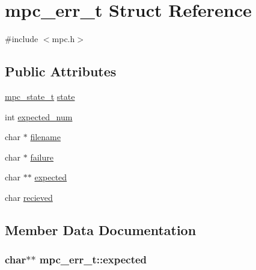 \hypertarget{structmpc__err__t}{}\section{mpc\+\_\+err\+\_\+t Struct Reference}
\label{structmpc__err__t}


{\ttfamily \#include $<$mpc.\+h$>$}

\subsection*{Public Attributes}
\begin{DoxyCompactItemize}
\item 
\hyperlink{structmpc__state__t}{mpc\+\_\+state\+\_\+t} \hyperlink{structmpc__err__t_ae853dbb8233311c81426d93839e5fae7}{state}
\item 
int \hyperlink{structmpc__err__t_ae577756565dd7a3cbc734ef8257d529c}{expected\+\_\+num}
\item 
char $\ast$ \hyperlink{structmpc__err__t_ae775901278f5c56fc3c5f95ae0ba2bc0}{filename}
\item 
char $\ast$ \hyperlink{structmpc__err__t_ae49eac3061b0608446f80b168cebbbc0}{failure}
\item 
char $\ast$$\ast$ \hyperlink{structmpc__err__t_acb5d0005a58f2ed13d22d3a45d69f0ae}{expected}
\item 
char \hyperlink{structmpc__err__t_a63ece2ebc4e4df2ebd89bebfddde7984}{recieved}
\end{DoxyCompactItemize}


\subsection{Member Data Documentation}
\hypertarget{structmpc__err__t_acb5d0005a58f2ed13d22d3a45d69f0ae}{}
\subsubsection[{expected}]{\setlength{\rightskip}{0pt plus 5cm}char$\ast$$\ast$ mpc\+\_\+err\+\_\+t\+::expected}\label{structmpc__err__t_acb5d0005a58f2ed13d22d3a45d69f0ae}
\hypertarget{structmpc__err__t_ae577756565dd7a3cbc734ef8257d529c}{}
